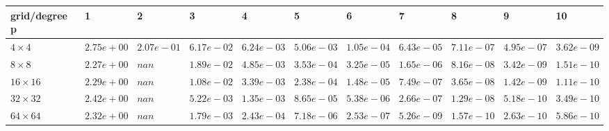 \begin{tabular}{lllllllllll}
\hline
 grid/degree p   & 1          & 2          & 3          & 4          & 5          & 6          & 7          & 8          & 9          & 10         \\
\hline
 $4 \times 4$    & $2.75e+00$ & $2.07e-01$ & $6.17e-02$ & $6.24e-03$ & $5.06e-03$ & $1.05e-04$ & $6.43e-05$ & $7.11e-07$ & $4.95e-07$ & $3.62e-09$ \\
 $8 \times 8$    & $2.27e+00$ & $nan$      & $1.89e-02$ & $4.85e-03$ & $3.53e-04$ & $3.25e-05$ & $1.65e-06$ & $8.16e-08$ & $3.42e-09$ & $1.51e-10$ \\
 $16 \times 16$  & $2.29e+00$ & $nan$      & $1.08e-02$ & $3.39e-03$ & $2.38e-04$ & $1.48e-05$ & $7.49e-07$ & $3.65e-08$ & $1.42e-09$ & $1.11e-10$ \\
 $32 \times 32$  & $2.42e+00$ & $nan$      & $5.22e-03$ & $1.35e-03$ & $8.65e-05$ & $5.38e-06$ & $2.66e-07$ & $1.29e-08$ & $5.18e-10$ & $3.49e-10$ \\
 $64 \times 64$  & $2.32e+00$ & $nan$      & $1.79e-03$ & $2.43e-04$ & $7.18e-06$ & $2.53e-07$ & $5.26e-09$ & $1.57e-10$ & $2.63e-10$ & $5.86e-10$ \\
\hline
\end{tabular}